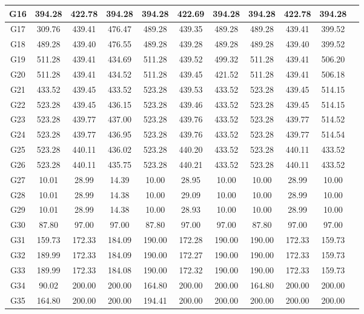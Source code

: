 \begin{table*}
\begin{threeparttable}[c]
{\begin{tabular}{|c|c|c|c|c|c|c|c|c|c|c|}
\hline
G16	&	394.28	&	422.78	&	394.28	&	394.28	&	422.69	&	394.28	&	394.28	&	422.78	&	394.28\\
\hline
G17	&	309.76	&	439.41	&	476.47	&	489.28	&	439.35	&	489.28	&	489.28	&	439.41	&	399.52\\
\hline
G18	&	489.28	&	439.40	&	476.55	&	489.28	&	439.28	&	489.28	&	489.28	&	439.40	&	399.52\\
\hline
G19	&	511.28	&	439.41	&	434.69	&	511.28	&	439.52	&	499.32	&	511.28	&	439.41	&	506.20\\
\hline
G20	&	511.28	&	439.41	&	434.52	&	511.28	&	439.45	&	421.52	&	511.28	&	439.41	&	506.18\\
\hline
G21	&	433.52	&	439.45	&	433.52	&	523.28	&	439.53	&	433.52	&	523.28	&	439.45	&	514.15\\
\hline
G22	&	523.28	&	439.45	&	436.15	&	523.28	&	439.46	&	433.52	&	523.28	&	439.45	&	514.15\\
\hline
G23	&	523.28	&	439.77	&	437.00	&	523.28	&	439.76	&	433.52	&	523.28	&	439.77	&	514.52\\
\hline
G24	&	523.28	&	439.77	&	436.95	&	523.28	&	439.76	&	433.52	&	523.28	&	439.77	&	514.54\\
\hline
G25	&	523.28	&	440.11	&	436.02	&	523.28	&	440.20	&	433.52	&	523.28	&	440.11	&	433.52\\
\hline
G26	&	523.28	&	440.11	&	435.75	&	523.28	&	440.21	&	433.52	&	523.28	&	440.11	&	433.52\\
\hline
G27	&	10.01	&	28.99	&	14.39	&	10.00	&	28.95	&	10.00	&	10.00	&	28.99	&	10.00\\
\hline
G28	&	10.01	&	28.99	&	14.38	&	10.00	&	29.09	&	10.00	&	10.00	&	28.99	&	10.00\\
\hline
G29	&	10.01	&	28.99	&	14.38	&	10.00	&	28.93	&	10.00	&	10.00	&	28.99	&	10.00\\
\hline
G30	&	87.80	&	97.00	&	97.00	&	87.80	&	97.00	&	97.00	&	87.80	&	97.00	&	97.00\\
\hline
G31	&	159.73	&	172.33	&	184.09	&	190.00	&	172.28	&	190.00	&	190.00	&	172.33	&	159.73\\
\hline
G32	&	189.99	&	172.33	&	184.09	&	190.00	&	172.27	&	190.00	&	190.00	&	172.33	&	159.73\\
\hline
G33	&	189.99	&	172.33	&	184.08	&	190.00	&	172.32	&	190.00	&	190.00	&	172.33	&	159.73\\
\hline
G34	&	90.02	&	200.00	&	200.00	&	164.80	&	200.00	&	200.00	&	164.80	&	200.00	&	200.00\\
\hline
G35	&	164.80	&	200.00	&	200.00	&	194.41	&	200.00	&	200.00	&	200.00	&	200.00	&	200.00\\

\end{tabular}}
\end{threeparttable}
\end{table*}
